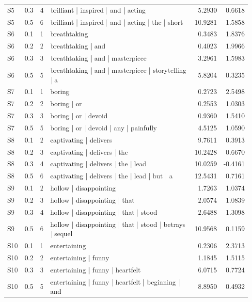 \begin{longtable}{@{}lrrp{}rr@{}}
S5 & 0.3 & 4 & brilliant | inspired | and | acting & 5.2930 & 0.6618 \\
S5 & 0.5 & 6 & brilliant | inspired | and | acting | the | short & 10.9281 & 1.5858 \\
S6 & 0.1 & 1 & breathtaking & 0.3483 & 1.8376 \\
S6 & 0.2 & 2 & breathtaking | and & 0.4023 & 1.9966 \\
S6 & 0.3 & 3 & breathtaking | and | masterpiece & 3.2961 & 1.5983 \\
S6 & 0.5 & 5 & breathtaking | and | masterpiece | storytelling | a & 5.8204 & 0.3235 \\
S7 & 0.1 & 1 & boring & 0.2723 & 2.5498 \\
S7 & 0.2 & 2 & boring | or & 0.2553 & 1.0303 \\
S7 & 0.3 & 3 & boring | or | devoid & 0.9360 & 1.5410 \\
S7 & 0.5 & 5 & boring | or | devoid | any | painfully & 4.5125 & 1.0590 \\
S8 & 0.1 & 2 & captivating | delivers & 9.7611 & 0.3913 \\
S8 & 0.2 & 3 & captivating | delivers | the & 10.2428 & 0.6670 \\
S8 & 0.3 & 4 & captivating | delivers | the | lead & 10.0259 & -0.4161 \\
S8 & 0.5 & 6 & captivating | delivers | the | lead | but | a & 12.5431 & 0.7161 \\
S9 & 0.1 & 2 & hollow | disappointing & 1.7263 & 1.0374 \\
S9 & 0.2 & 3 & hollow | disappointing | that & 2.0574 & 1.0839 \\
S9 & 0.3 & 4 & hollow | disappointing | that | stood & 2.6488 & 1.3098 \\
S9 & 0.5 & 6 & hollow | disappointing | that | stood | betrays | sequel & 10.9568 & 0.1159 \\
S10 & 0.1 & 1 & entertaining & 0.2306 & 2.3713 \\
S10 & 0.2 & 2 & entertaining | funny & 1.1845 & 1.5115 \\
S10 & 0.3 & 3 & entertaining | funny | heartfelt & 6.0715 & 0.7724 \\
S10 & 0.5 & 5 & entertaining | funny | heartfelt | beginning | and & 8.8950 & 0.4932 \\
\end{longtable}
